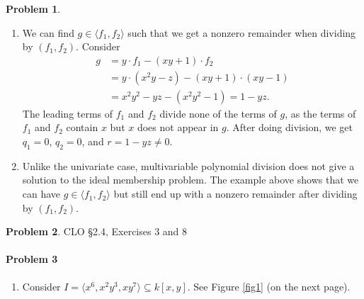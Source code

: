 \documentclass[12pt]{amsart}
\theoremstyle{definition}
\newtheorem{prob}{Problem}
\begin{document}
\begin{flushleft}
\begin{prob}
\begin{enumerate}
    \item[d.] We can find $g \in \langle f_1, f_2\rangle$ such that we get a nonzero remainder when dividing by $(f_1,f_2)$. Consider \begin{align*}
        g &= y\cdot f_1 -(xy+1)\cdot f_2  \\
        &= y \cdot (x^2y-z) - (xy+1)\cdot (xy-1) \\
        &= x^2 y^2 - yz - (x^2 y^2 - 1)
        = 1-yz.
    \end{align*} 
    The leading terms of $f_1$ and $f_2$ divide none of the terms of $g$, as the terms of $f_1$ and $f_2$ contain $x$ but $x$ does not appear in $g$. After doing division, we get $q_1 = 0$, $q_2 = 0$, and $r = 1-yz \ne 0$.
    \item[e.] Unlike the univariate case, multivariable polynomial division does not give a solution to the ideal membership problem. The example above shows that we can have $g\in \langle f_1,f_2\rangle$ but still end up with a nonzero remainder after dividing by $(f_1,f_2)$.
\end{enumerate}
\end{prob}
\bigskip 

\begin{prob} CLO \S2.4, Exercises 3 and  8\smallskip
 \\
\paragraph{Problem 3}
\begin{enumerate}
    \item[a.] Consider $I = \langle x^6, x^2y^3, xy^7\rangle \subseteq k[x,y]$. See Figure \ref{fig1} (on the next page).
    \begin{figure}
\end{figure}
\end{enumerate}
\end{prob}
\end{flushleft}
\end{document}
